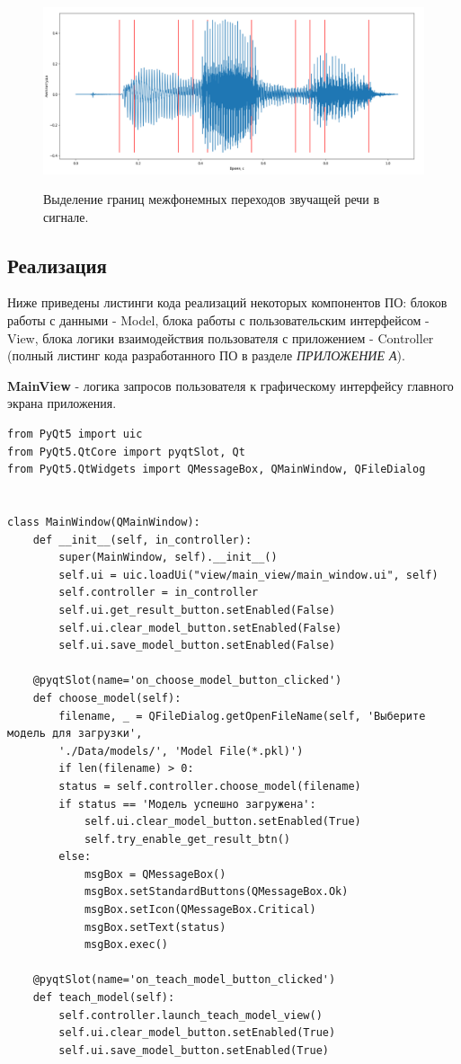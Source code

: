 \documentclass[utf8x, 14pt, oneside, a4paper]{article}
\begin{document}
\begin{itemize}
		\begin{figure}[h!]
			\begin{center}
				{\includegraphics[scale = 0.5]{img/get_results.png}}
			\end{center}
			\caption{Выделение границ межфонемных переходов звучащей речи в сигнале.}
			\label{ris:get_results}
		\end{figure}
	\end{itemize}
	
	\subsection{Реализация}
	
	Ниже приведены листинги кода реализаций некоторых компонентов ПО: блоков работы с данными - Model, блока работы с пользовательским интерфейсом - View, блока логики взаимодействия пользователя с приложением - Controller (полный листинг кода разработанного ПО в разделе \textit{ПРИЛОЖЕНИЕ А}).
	
	{\bf MainView} - логика запросов пользователя к графическому интерфейсу главного экрана приложения.
		
		\begin{lstlisting}[caption=MainView]
from PyQt5 import uic
from PyQt5.QtCore import pyqtSlot, Qt
from PyQt5.QtWidgets import QMessageBox, QMainWindow, QFileDialog


class MainWindow(QMainWindow):
	def __init__(self, in_controller):
		super(MainWindow, self).__init__()
		self.ui = uic.loadUi("view/main_view/main_window.ui", self)
		self.controller = in_controller
		self.ui.get_result_button.setEnabled(False)
		self.ui.clear_model_button.setEnabled(False)
		self.ui.save_model_button.setEnabled(False)
	
	@pyqtSlot(name='on_choose_model_button_clicked')
	def choose_model(self):
		filename, _ = QFileDialog.getOpenFileName(self, 'Выберите модель для загрузки',
		'./Data/models/', 'Model File(*.pkl)')
		if len(filename) > 0:
		status = self.controller.choose_model(filename)
		if status == 'Модель успешно загружена':
			self.ui.clear_model_button.setEnabled(True)
			self.try_enable_get_result_btn()
		else:
			msgBox = QMessageBox()
			msgBox.setStandardButtons(QMessageBox.Ok)
			msgBox.setIcon(QMessageBox.Critical)
			msgBox.setText(status)
			msgBox.exec()
	
	@pyqtSlot(name='on_teach_model_button_clicked')
	def teach_model(self):
		self.controller.launch_teach_model_view()
		self.ui.clear_model_button.setEnabled(True)
		self.ui.save_model_button.setEnabled(True)
	\end{lstlisting}
	
\end{document}
